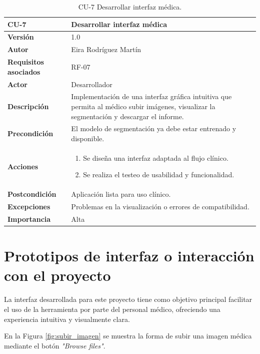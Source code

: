 \begin{table}[!h]
	\centering
	\begin{tabularx}{\linewidth}{ p{} p{} }
		\toprule
		\textbf{CU-7}    & \textbf{Desarrollar interfaz médica}\\
		\toprule
		\textbf{Versión}              & 1.0    \\
		\textbf{Autor}                & Eira Rodríguez Martín \\
		\textbf{Requisitos asociados} & RF-07 \\
        \textbf{Actor}                & Desarrollador \\
		\textbf{Descripción}          & Implementación de una interfaz gráfica intuitiva que permita al médico subir imágenes, visualizar la segmentación y descargar el informe.\\
		\textbf{Precondición}         & El modelo de segmentación ya debe estar entrenado y disponible. \\
		\textbf{Acciones}             &
		\begin{enumerate}
			\def\labelenumi{\arabic{enumi}.}
			\tightlist
			\item Se diseña una interfaz adaptada al flujo clínico.
			\item Se realiza el testeo de usabilidad y funcionalidad.
		\end{enumerate}\\
		\textbf{Postcondición}        & Aplicación lista para uso clínico. \\
		\textbf{Excepciones}          & Problemas en la visualización o errores de compatibilidad. \\
		\textbf{Importancia}          & Alta \\
		\bottomrule
	\end{tabularx}
	\caption{CU-7 Desarrollar interfaz médica.}
\end{table}
\FloatBarrier
\section{Prototipos de interfaz o interacción con el proyecto}

La interfaz desarrollada para este proyecto tiene como objetivo principal facilitar el uso de la herramienta por parte del personal médico, ofreciendo una experiencia intuitiva y visualmente clara. 

En la Figura \ref{fig:subir_imagen} se muestra la forma de subir una imagen médica mediante el botón \textit{"Browse files"}.

